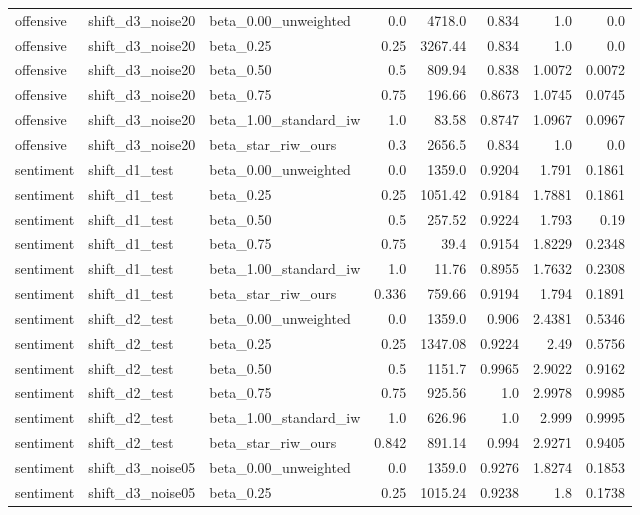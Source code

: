 \begin{table}[htbp]
{\begin{tabular}{lllrrrrr}
offensive & shift\_d3\_noise20 & beta\_0.00\_unweighted & 0.0 & 4718.0 & 0.834 & 1.0 & 0.0 \\
offensive & shift\_d3\_noise20 & beta\_0.25 & 0.25 & 3267.44 & 0.834 & 1.0 & 0.0 \\
offensive & shift\_d3\_noise20 & beta\_0.50 & 0.5 & 809.94 & 0.838 & 1.0072 & 0.0072 \\
offensive & shift\_d3\_noise20 & beta\_0.75 & 0.75 & 196.66 & 0.8673 & 1.0745 & 0.0745 \\
offensive & shift\_d3\_noise20 & beta\_1.00\_standard\_iw & 1.0 & 83.58 & 0.8747 & 1.0967 & 0.0967 \\
offensive & shift\_d3\_noise20 & beta\_star\_riw\_ours & 0.3 & 2656.5 & 0.834 & 1.0 & 0.0 \\
sentiment & shift\_d1\_test & beta\_0.00\_unweighted & 0.0 & 1359.0 & 0.9204 & 1.791 & 0.1861 \\
sentiment & shift\_d1\_test & beta\_0.25 & 0.25 & 1051.42 & 0.9184 & 1.7881 & 0.1861 \\
sentiment & shift\_d1\_test & beta\_0.50 & 0.5 & 257.52 & 0.9224 & 1.793 & 0.19 \\
sentiment & shift\_d1\_test & beta\_0.75 & 0.75 & 39.4 & 0.9154 & 1.8229 & 0.2348 \\
sentiment & shift\_d1\_test & beta\_1.00\_standard\_iw & 1.0 & 11.76 & 0.8955 & 1.7632 & 0.2308 \\
sentiment & shift\_d1\_test & beta\_star\_riw\_ours & 0.336 & 759.66 & 0.9194 & 1.794 & 0.1891 \\
sentiment & shift\_d2\_test & beta\_0.00\_unweighted & 0.0 & 1359.0 & 0.906 & 2.4381 & 0.5346 \\
sentiment & shift\_d2\_test & beta\_0.25 & 0.25 & 1347.08 & 0.9224 & 2.49 & 0.5756 \\
sentiment & shift\_d2\_test & beta\_0.50 & 0.5 & 1151.7 & 0.9965 & 2.9022 & 0.9162 \\
sentiment & shift\_d2\_test & beta\_0.75 & 0.75 & 925.56 & 1.0 & 2.9978 & 0.9985 \\
sentiment & shift\_d2\_test & beta\_1.00\_standard\_iw & 1.0 & 626.96 & 1.0 & 2.999 & 0.9995 \\
sentiment & shift\_d2\_test & beta\_star\_riw\_ours & 0.842 & 891.14 & 0.994 & 2.9271 & 0.9405 \\
sentiment & shift\_d3\_noise05 & beta\_0.00\_unweighted & 0.0 & 1359.0 & 0.9276 & 1.8274 & 0.1853 \\
sentiment & shift\_d3\_noise05 & beta\_0.25 & 0.25 & 1015.24 & 0.9238 & 1.8 & 0.1738 \\

\end{tabular}}
\end{table}
